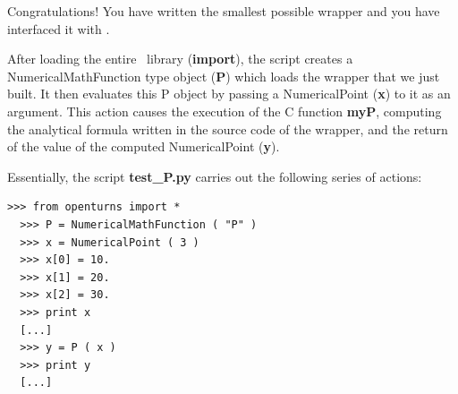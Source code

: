 Congratulations! You have written the smallest possible wrapper and you have interfaced it with \OT.

After loading the entire \OT\ library ({\bf import}), the script creates a NumericalMathFunction type object ({\bf P}) which loads the wrapper that we just built. It then evaluates this P object by passing a NumericalPoint ({\bf x}) to it as an argument. This action causes the execution of the C function {\bf myP}, computing the analytical formula written in the source code of the wrapper, and the return of the value of the computed NumericalPoint ({\bf y}).

Essentially, the script {\bf test\_P.py} carries out the following series of actions:

\lstset{language=Python, basicstyle=\normalsize}
\begin{lstlisting}[frame=TBRL]
  >>> from openturns import *
  >>> P = NumericalMathFunction ( "P" )
  >>> x = NumericalPoint ( 3 )
  >>> x[0] = 10.
  >>> x[1] = 20.
  >>> x[2] = 30.
  >>> print x
  [...]
  >>> y = P ( x )
  >>> print y
  [...]
\end{lstlisting}
